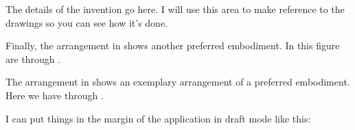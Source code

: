 

\npar The details of the invention go here. I will use this area to make reference to the drawings so you can see how it's done. 



\npar Finally, the arrangement in  shows another preferred embodiment. In this figure are   through .

\npar The arrangement in  shows an exemplary arrangement of a preferred embodiment. Here we have     through . 

\npar I can put things in the margin of the application in draft mode like this: 

